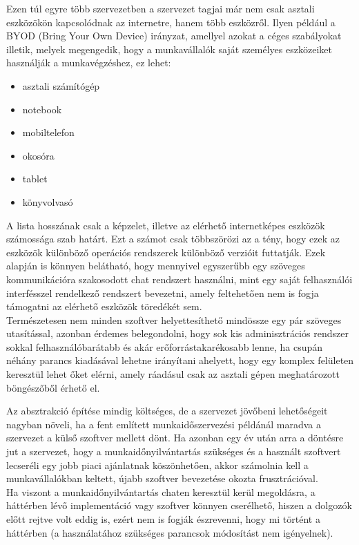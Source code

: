 Ezen túl egyre több szervezetben a szervezet tagjai már nem csak asztali eszközökön kapcsolódnak az internetre, hanem több eszközről. Ilyen például a BYOD (Bring Your Own Device) irányzat, amellyel azokat a céges szabályokat illetik, melyek megengedik, hogy a munkavállalók saját személyes eszközeiket használják a munkavégzéshez, ez lehet:

\begin{itemize}
  \item asztali számítógép
  \item notebook
  \item mobiltelefon
  \item okosóra
  \item tablet
  \item könyvolvasó
\end{itemize}

A lista hosszának csak a képzelet, illetve az elérhető internetképes eszközök számossága szab határt. Ezt a számot csak többszörözi az a tény, hogy ezek az eszközök különböző operációs rendszerek különböző verzióit futtatják. Ezek alapján is könnyen belátható, hogy mennyivel egyszerűbb egy szöveges kommunikációra szakosodott chat rendszert használni, mint egy saját felhasználói interfésszel rendelkező rendszert bevezetni, amely feltehetően nem is fogja támogatni az elérhető eszközök töredékét sem.\\
\newline
Természetesen nem minden szoftver helyettesíthető mindössze egy pár szöveges utasítással, azonban érdemes belegondolni, hogy sok kis adminisztrációs rendszer sokkal felhasználóbarátabb és akár erőforrástakarékosabb lenne, ha csupán néhány parancs kiadásával lehetne irányítani ahelyett, hogy egy komplex felületen keresztül lehet őket elérni, amely ráadásul csak az asztali gépen meghatározott böngészőből érhető el.

Az absztrakció építése mindig költséges, de a szervezet jövőbeni lehetőségeit nagyban növeli, ha a fent említett munkaidőszervezési példánál maradva a szervezet a külső szoftver mellett dönt. Ha azonban egy év után arra a döntésre jut a szervezet, hogy a munkaidőnyilvántartás szükséges és a használt szoftvert lecseréli egy jobb piaci ajánlatnak köszönhetően, akkor számolnia kell a munkavállalókban keltett, újabb szoftver bevezetése okozta frusztrációval.\\
Ha viszont a munkaidőnyilvántartás chaten keresztül kerül megoldásra, a háttérben lévő implementáció vagy szoftver könnyen cserélhető, hiszen a dolgozók előtt rejtve volt eddig is, ezért nem is fogják észrevenni, hogy mi történt a háttérben (a használatához szükséges parancsok módosítást nem igényelnek).

